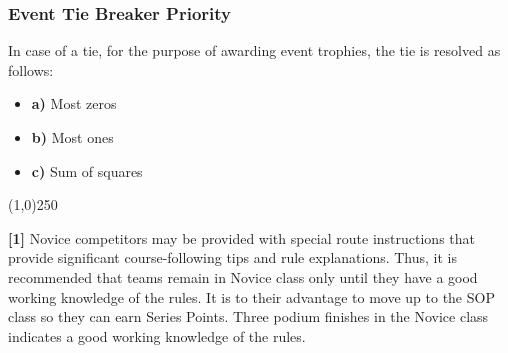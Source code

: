 \subsubsection{Event Tie Breaker Priority}
In case of a tie, for the purpose of awarding event trophies, the tie is resolved as follows:
\begin{itemize}
\item \textbf{a)} Most zeros
\item \textbf{b)} Most ones
\item \textbf{c)} Sum of squares
\end{itemize}

\begin{center}
\line(1,0){250}
\end{center}
\textbf{[1]} Novice competitors may be provided with special route instructions that provide significant course-following tips and rule explanations. Thus, it is recommended that teams remain in Novice class only until they have a good working knowledge of the rules. It is to their advantage to move up to the SOP class so they can earn Series Points. Three podium finishes in the Novice class indicates a good working knowledge of the rules.
